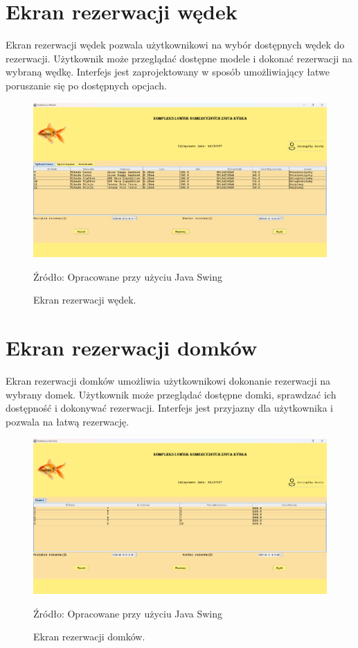 \section{Ekran rezerwacji wędek}
Ekran rezerwacji wędek pozwala użytkownikowi na wybór dostępnych wędek do rezerwacji. Użytkownik może przeglądać dostępne modele i dokonać rezerwacji na wybraną wędkę. Interfejs jest zaprojektowany w sposób umożliwiający łatwe poruszanie się po dostępnych opcjach.
\begin{figure}[H]
    \centering
    \includegraphics[width=0.8\linewidth]{figures/rods.eps}
    \caption{Ekran rezerwacji wędek.}
    \label{fig:rods_screen}
    \small{Źródło: Opracowane przy użyciu Java Swing}
\end{figure}
\clearpage

\section{Ekran rezerwacji domków}
Ekran rezerwacji domków umożliwia użytkownikowi dokonanie rezerwacji na wybrany domek. Użytkownik może przeglądać dostępne domki, sprawdzać ich dostępność i dokonywać rezerwacji. Interfejs jest przyjazny dla użytkownika i pozwala na łatwą rezerwację.
\begin{figure}[H]
    \centering
    \includegraphics[width=0.8\linewidth]{figures/houses.eps}
    \caption{Ekran rezerwacji domków.}
    \label{fig:houses_screen}
    \small{Źródło: Opracowane przy użyciu Java Swing}
\end{figure}
\clearpage

